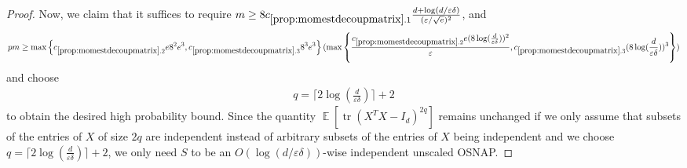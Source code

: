 \documentclass[11pt]{amsart}
\numberwithin{equation}{section}
\numberwithin{equation}{section}
\DeclareMathOperator{\E}{\mathbb{E}}
\DeclareMathOperator*{\tr}{tr}
\theoremstyle{remark}
\theoremstyle{definition}
\begin{document}
\begin{proof}
Now, we claim that it suffices to require $m \ge 8c_{\ref*{prop:momestdecoupmatrix}.1} \frac{d+\log(d/\varepsilon\delta)}{(\varepsilon/\sqrt{e})^2}$, and 
\begin{equation}\label{pmassum}
    pm \ge \max \left\{ c_{\ref*{prop:momestdecoupmatrix}.2}{e} 8^2e^3, c_{\ref*{prop:momestdecoupmatrix}.3} 8^3 e^3 \right\}(\max \left\{ \frac{c_{\ref*{prop:momestdecoupmatrix}.2}{e} (8\log(\frac{d}{\varepsilon \delta}))^2}{ \varepsilon}, c_{\ref*{prop:momestdecoupmatrix}.3} (8\log(\frac{d}{\varepsilon \delta}))^3 \right\})
\end{equation}
and choose \begin{align*}q=\lceil 2\log (\frac{d}{\varepsilon \delta} )\rceil+2\end{align*} to obtain the desired high probability bound. Since the quantity $\E[\tr(X^TX - I_d)^{2q}]$ remains unchanged if we only assume that subsets of the entries of $X$ of size $2q$ are independent instead of arbitrary subsets of the entries of $X$ being independent and we choose $q=\lceil 2\log (\frac{d}{\varepsilon \delta} )\rceil+2$, we only need $S$ to be an $O(\log(d/\varepsilon\delta))$-wise independent unscaled OSNAP.



\end{proof}
\end{document}
